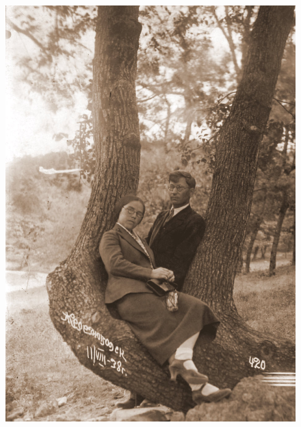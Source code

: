\begin{figure}[h!]
\begin{minipage}[h!]{0.16\paperwidth}
    \end{minipage}
    \hfill
   \begin{minipage}[h]{0.32\paperwidth}
       \includegraphics[width=\linewidth]{inc/Menshekovy/12.jpg} 
   \end{minipage}
   \hfill
    \begin{minipage}[h!]{0.16\paperwidth}

\end{minipage}
\end{figure}
